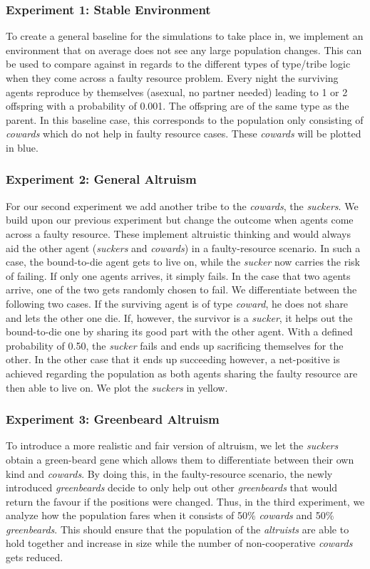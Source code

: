 \documentclass[sigconf]{acmart}
\newcommand{\todo}[1]{{\color{red}{#1}}}
\newcommand{\VProbAltruistDies}{0.50\xspace}
\newcommand{\VProbKids}{0.001\xspace}
\newcommand{\cowards}{\textit{cowards}\xspace}
\newcommand{\coward}{\textit{coward}\xspace}
\newcommand{\altruists}{\textit{altruists}\xspace}
\newcommand{\suckers}{\textit{suckers}\xspace}
\newcommand{\sucker}{\textit{sucker}\xspace}
\newcommand{\greenbeards}{\textit{greenbeards}\xspace}
\begin{document}
    \subsubsection*{Experiment 1: Stable Environment}
    To create a general baseline for the simulations to take place in, we implement an environment that on average does not see any large population changes.
    This can be used to compare against in regards to the different types of type/tribe logic when they come across a faulty resource problem.
    Every night the surviving agents reproduce by themselves (asexual, no partner needed) leading to 1 or 2 offspring with a probability of \VProbKids.
    The offspring are of the same type as the parent.
    In this baseline case, this corresponds to the population only consisting of \cowards which do not help in faulty resource cases.
    These \cowards will be plotted in blue.

    \subsubsection*{Experiment 2: General Altruism}
    For our second experiment we add another tribe to the \cowards, the \suckers.
    We build upon our previous experiment but change the outcome when agents come across a faulty resource.
    These implement altruistic thinking and would always aid the other agent (\suckers and \cowards) in a faulty-resource scenario.
    In such a case, the bound-to-die agent gets to live on, while the \sucker now carries the risk of failing.
    If only one agents arrives, it simply fails.
    In the case that two agents arrive, one of the two gets randomly chosen to fail.
    We differentiate between the following two cases.
    If the surviving agent is of type \coward, he does not share and lets the other one die.
    If, however, the survivor is a \sucker, it helps out the bound-to-die one by sharing its good part with the other agent.
    With a defined probability of \VProbAltruistDies, the \sucker fails and ends up sacrificing themselves for the other.
    In the other case that it ends up succeeding however, a net-positive is achieved regarding the population as both agents sharing the faulty resource are then able to live on.
    We plot the \suckers in yellow.


    \todo{add code with logic}

    \subsubsection*{Experiment 3: Greenbeard Altruism}
    To introduce a more realistic and fair version of altruism, we let the \suckers obtain a green-beard gene which allows them to differentiate between their own kind and \cowards.
    By doing this, in the faulty-resource scenario, the newly introduced \greenbeards decide to only help out other \greenbeards that would return the favour if the positions were changed.
    Thus, in the third experiment, we analyze how the population fares when it consists of 50\% \cowards and 50\% \greenbeards.
    This should ensure that the population of the \altruists are able to hold together and increase in size while the number of non-cooperative \cowards gets reduced.
\end{document}
